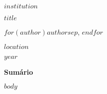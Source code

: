\documentclass[12pt]{article}
\newcommand{\ABNTTitle}{$title$}
\newcommand{\ABNTAuthor}{$for(author)$$author$$sep$, $endfor$}
\newcommand{\ABNTInstit}{$institution$}
\newcommand{\ABNTCity}{$location$}
\newcommand{\ABNTYear}{$year$}
\begin{document}
\thispagestyle{empty}
\begin{center}
{\large \textbf{\ABNTInstit}\par}
\vfill
{\LARGE \textbf{\ABNTTitle}\par}
\vspace{1.5em}
{\large \ABNTAuthor\par}
\vfill
{\large \ABNTCity\par}
{\large \ABNTYear\par}
\end{center}
\clearpage

{\bfseries\large Sumário}\par
\tableofcontents
\clearpage

\setcounter{page}{1}
$body$
\end{document}
